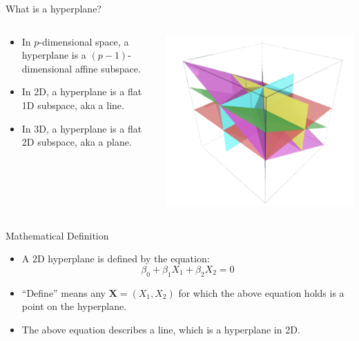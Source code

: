 \begin{frame}{What is a hyperplane?}
\begin{columns}
  \begin{column}{0.55\textwidth}
    \begin{itemize}
      \item In $p$-dimensional space, a hyperplane is a $(p-1)$-dimensional affine subspace.
      \item In 2D, a hyperplane is a flat 1D subspace, aka a line.
      \item In 3D, a hyperplane is a flat 2D subspace, aka a plane.
    \end{itemize}
  \end{column}
  \begin{column}{0.45\textwidth}
    \includegraphics[width=\textwidth]{images/support-vector-machines/support-vector-machines-2.png}
  \end{column}
\end{columns}
\end{frame}


\begin{frame}{Mathematical Definition}
\begin{itemize}
  \item A 2D hyperplane is defined by the equation:
  \[
  \beta_0 + \beta_1 X_1 + \beta_2 X_2 = 0
  \]
  \item “Define” means any $\mathbf{X} = (X_1, X_2)$ for which the above equation holds is a point on the hyperplane.
  \item The above equation describes a line, which is a hyperplane in 2D.
\end{itemize}
\end{frame}


